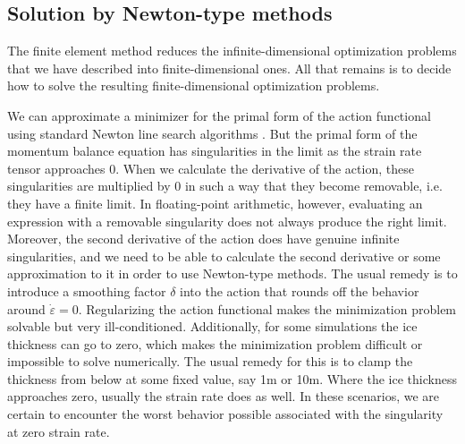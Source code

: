 \documentclass[review,oneside]{igs}
\begin{document}
\subsection{Solution by Newton-type methods}
\label{app:solution}

The finite element method reduces the infinite-dimensional optimization problems that we have described into finite-dimensional ones.
All that remains is to decide how to solve the resulting finite-dimensional optimization problems.

We can approximate a minimizer for the primal form of the action functional using standard Newton line search algorithms \citep{shapero2021icepack}.
But the primal form of the momentum balance equation has singularities in the limit as the strain rate tensor approaches 0.
When we calculate the derivative of the action, these singularities are multiplied by 0 in such a way that they become removable, i.e. they have a finite limit.
In floating-point arithmetic, however, evaluating an expression with a removable singularity does not always produce the right limit.
Moreover, the second derivative of the action does have genuine infinite singularities, and we need to be able to calculate the second derivative or some approximation to it in order to use Newton-type methods.
The usual remedy is to introduce a smoothing factor $\delta$ into the action that rounds off the behavior around $\dot\varepsilon = 0$.
Regularizing the action functional makes the minimization problem solvable but very ill-conditioned.
Additionally, for some simulations the ice thickness can go to zero, which makes the minimization problem difficult or impossible to solve numerically.
The usual remedy for this is to clamp the thickness from below at some fixed value, say 1m or 10m.
Where the ice thickness approaches zero, usually the strain rate does as well.
In these scenarios, we are certain to encounter the worst behavior possible associated with the singularity at zero strain rate.
\end{document}
